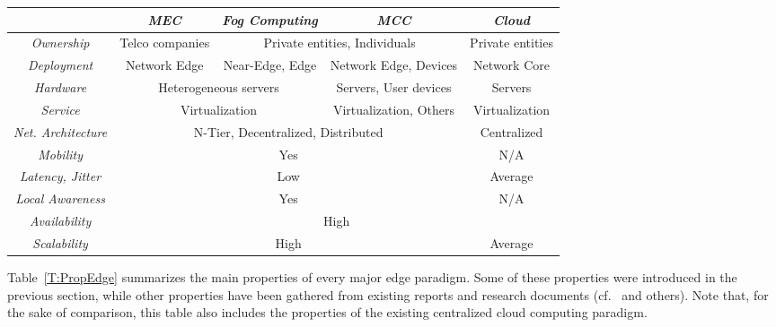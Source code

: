 \documentclass[twocolumn,preprint,3p]{elsarticle}
\begin{document}
\begin{table*}[!htb]
\centering
\begin{scriptsize}
\begin{tabular}{|c|c|c|c|c|}
  \hline
& \textit{MEC} & \textit{Fog Computing} & \textit{MCC} & \textit{Cloud} \\
  \hline
  \textit{Ownership} & Telco companies & \multicolumn{2}{|c|}{Private entities, Individuals} & Private entities \\
  \hline
  \textit{Deployment} & Network Edge & Near-Edge, Edge & Network Edge, Devices & Network Core \\
  \hline
  \textit{Hardware} & \multicolumn{2}{|c|}{Heterogeneous servers} & Servers, User devices & Servers \\
  \hline
  \textit{Service} & \multicolumn{2}{|c|}{Virtualization} & Virtualization, Others & Virtualization \\
  \hline
  \textit{Net. Architecture} & \multicolumn{3}{|c|}{N-Tier, Decentralized, Distributed} & Centralized \\
  \hline
  \textit{Mobility} & \multicolumn{3}{|c|}{Yes} & N/A \\
  \hline
  \textit{Latency, Jitter} & \multicolumn{3}{|c|}{Low} & Average \\
  \hline
  \textit{Local Awareness} & \multicolumn{3}{|c|}{Yes} & N/A \\
  \hline
  \textit{Availability} & \multicolumn{4}{|c|}{High} \\
  \hline
  \textit{Scalability} & \multicolumn{3}{|c|}{High} & Average \\
  \hline
\end{tabular}
\end{scriptsize}
\caption{Comparison of features of Edge paradigms}\label{T:PropEdge}
\end{table*}

Table~\ref{T:PropEdge} summarizes the main properties of every major edge paradigm. Some of these properties were introduced in the previous section, while other properties have been gathered from existing reports and research documents (cf.~\cite{MEDwhite15,Puente15,OpenFog15,Luan15,Rahimi14,Dinh13} and others). Note that, for the sake of comparison, this table also includes the properties of the existing centralized cloud computing paradigm.
\end{document}
